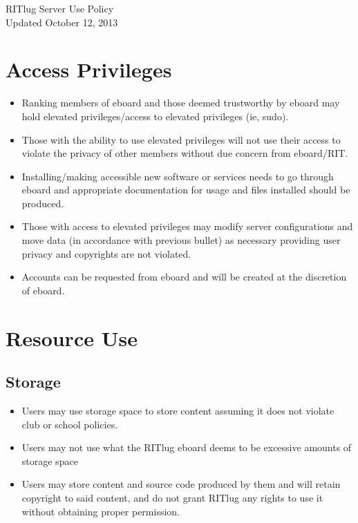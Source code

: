 


\begin{center}
\LARGE RITlug Server Use Policy \\[0.0625in]
\large Updated October 12, 2013
\end{center}

\section{Access Privileges}

\begin{itemize}
\item Ranking members of eboard and those deemed trustworthy by eboard may hold elevated privileges/access to elevated privileges (ie, sudo).
\item Those with the ability to use elevated privileges will not use their access to violate the privacy of other members without due concern from eboard/RIT.
\item Installing/making accessible new software or services needs to go through eboard and appropriate documentation for usage and files installed should be produced.
\item Those with access to elevated privileges may modify server configurations and move data (in accordance with previous bullet) as necessary providing user privacy and copyrights are not violated.
\item Accounts can be requested from eboard and will be created at the discretion of eboard.
\end{itemize}

\section{Resource Use}

\subsection{Storage}
\begin{itemize}
\item Users may use storage space to store content assuming it does not violate club or school policies.
\item Users may not use what the RITlug eboard deems to be excessive amounts of storage space
\item Users may store content and source code produced by them and will retain copyright to said content, and do not grant RITlug any rights to use it without obtaining proper permission.
\end{itemize}

